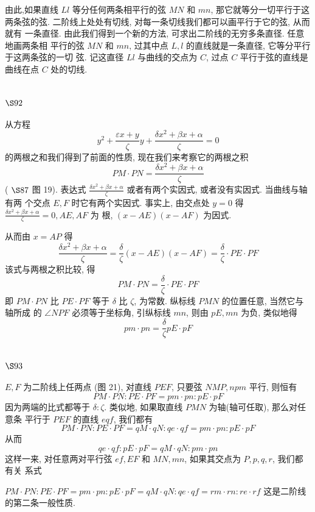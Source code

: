 由此,如果直线 $L l$ 等分任何两条相平行的弦 $M N$ 和 $m n$, 那它就等分一切平行于这 两条弦的弦. 二阶线上处处有切线, 对每一条切线我们都可以画平行于它的弦, 从而就有 一条直径. 由此我们得到一个新的方法, 可求出二阶线的无穷多条直径. 任意地画两条相 平行的弦 $M N$ 和 $m n$, 过其中点 $L, l$ 的直线就是一条直径, 它等分平行于这两条弦的一切 弦. 记这直径 $L l$ 与曲线的交点为 $C$, 过点 $C$ 平行于弦的直线是曲线在点 $C$ 处的切线.

\section{$\S 92$}

从方程
\[
y^{2}+\frac{\varepsilon x+y}{\zeta} y+\frac{\delta x^{2}+\beta x+\alpha}{\zeta}=0
\]
的两根之和我们得到了前面的性质, 现在我们来考察它的两根之积
\[
P M \cdot P N=\frac{\delta x^{2}+\beta x+\alpha}{\zeta}
\]
( $\S 87$ 图 19). 表达式 $\frac{\delta x^{2}+\beta x+\alpha}{\zeta}$ 或者有两个实因式, 或者没有实因式. 当曲线与轴有两 个交点 $E, F$ 时它有两个实因式. 事实上, 由交点处 $y=0$ 得 $\frac{\delta x^{2}+\beta x+\alpha}{\zeta}=0, A E, A F$ 为 根, $(x-A E)(x-A F)$ 为因式.

从而由 $x=A P$ 得
\[
\frac{\delta x^{2}+\beta x+\alpha}{\zeta}=\frac{\delta}{\zeta}(x-A E)(x-A F)=\frac{\delta}{\zeta} \cdot P E \cdot P F
\]
该式与两根之积比较, 得
\[
P M \cdot P N=\frac{\delta}{\zeta} \cdot P E \cdot P F
\]
即 $P M \cdot P N$ 比 $P E \cdot P F$ 等于 $\delta$ 比 $\zeta$, 为常数. 纵标线 $P M N$ 的位置任意, 当然它与轴所成 的 $\angle N P F$ 必须等于坐标角, 引纵标线 $m n$, 则由 $p E, m n$ 为负, 类似地得
\[
p m \cdot p n=\frac{\delta}{\zeta} p E \cdot p F
\]
\section{$\S 93$}

$E, F$ 为二阶线上任两点 (图 21), 对直线 $P E F$, 只要弦 $N M P, n p m$ 平行, 则恒有
\[
P M \cdot P N: P E \cdot P F=p m \cdot p n: p E \cdot p F
\]
因为两端的比式都等于 $\delta: \zeta$. 类似地, 如果取直线 $P M N$ 为轴(轴可任取), 那么对任意条 平行于 $P E F$ 的直线 $e q f$, 我们都有
\[
P M \cdot P N: P E \cdot P F=q M \cdot q N: q e \cdot q f=p m \cdot p n: p E \cdot p F
\]
从而
\[
q e \cdot q f: p E \cdot p F=q M \cdot q N: p m \cdot p n
\]
这样一来, 对任意两对平行弦 $e f, E F$ 和 $M N, m n$, 如果其交点为 $P, p, q, r$, 我们都有关 系式

$P M \cdot P N: P E \cdot P F=p m \cdot p n: p E \cdot p F=q M \cdot q N: q e \cdot q f=r m \cdot r n: r e \cdot r f$ 这是二阶线的第二条一般性质.


